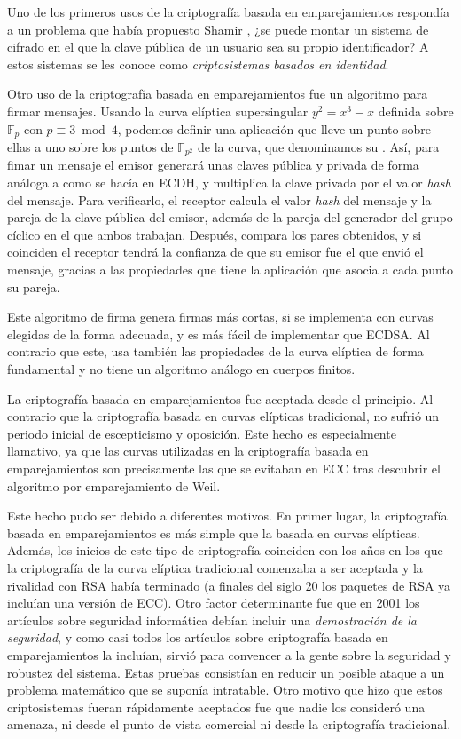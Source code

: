 \documentclass[
  a4paper,
  12pt,
  spanish,
]{scrartcl}
\begin{document}
Uno de los primeros usos de la criptografía basada en emparejamientos respondía a un problema que había propuesto Shamir \parencite{blakley_identity-based_1985}, ¿se puede montar un sistema de cifrado en el que la clave pública de un usuario sea su propio identificador? A estos sistemas se les conoce como \textit{criptosistemas basados en identidad}.

Otro uso de la criptografía basada en emparejamientos fue un algoritmo para firmar mensajes. Usando la curva elíptica supersingular $y^2 = x^3- x$ definida sobre $\mathbb{F}_p$ con $p \equiv 3 \bmod 4$, podemos definir una aplicación que lleve un punto sobre ellas a uno sobre los puntos de $\mathbb{F}_{p^2}$ de la curva, que denominamos su . Así, para fimar un mensaje el emisor generará unas claves pública y privada de forma análoga a como se hacía en ECDH, y multiplica la clave privada por el valor \textit{hash} del mensaje. Para verificarlo, el receptor calcula el valor \textit{hash} del mensaje y la pareja de la clave pública del emisor, además de la pareja del generador del grupo cíclico en el que ambos trabajan. Después, compara los pares obtenidos, y si coinciden el receptor tendrá la confianza de que su emisor fue el que envió el mensaje, gracias a las propiedades que tiene la aplicación que asocia a cada punto su pareja.

Este algoritmo de firma genera firmas más cortas, si se implementa con curvas elegidas de la forma adecuada, y es más fácil de implementar que ECDSA. Al contrario que este, usa también las propiedades de la curva elíptica de forma fundamental y no tiene un algoritmo análogo en cuerpos finitos.

La criptografía basada en emparejamientos fue aceptada desde el principio. Al contrario que la criptografía basada en curvas elípticas tradicional, no sufrió un periodo inicial de escepticismo y oposición. Este hecho es especialmente llamativo, ya que las curvas utilizadas en la criptografía basada en emparejamientos son precisamente las que se evitaban en ECC tras descubrir el algoritmo por emparejamiento de Weil.

Este hecho pudo ser debido a diferentes motivos. En primer lugar, la criptografía basada en emparejamientos es más simple que la basada en curvas elípticas. Además, los inicios de este tipo de criptografía coinciden con los años en los que la criptografía de la curva elíptica tradicional comenzaba a ser aceptada y la rivalidad con RSA había terminado (a finales del siglo 20 los paquetes de RSA ya incluían una versión de ECC). Otro factor determinante fue que en 2001 los artículos sobre seguridad informática debían incluir una \textit{demostración de la seguridad}, y como casi todos los artículos sobre criptografía basada en emparejamientos la incluían, sirvió para convencer a la gente sobre la seguridad y robustez del sistema. Estas pruebas consistían en reducir un posible ataque a un problema matemático que se suponía intratable. Otro motivo que hizo que estos criptosistemas fueran rápidamente aceptados fue que nadie los consideró una amenaza, ni desde el punto de vista comercial ni desde la criptografía tradicional. 
\end{document}
